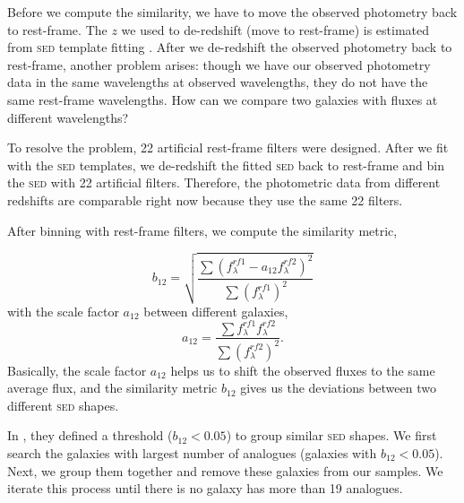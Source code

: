 \documentclass{ar-1col}
\begin{document}
Before we compute the similarity, we have to move the observed photometry back to rest-frame.
The $z$ we used to de-redshift (move to rest-frame) is estimated from \textsc{sed} template fitting \citep{Brammer2008}.
After we de-redshift the observed photometry back to rest-frame, another problem arises: though we have our observed photometry data in the same wavelengths at observed wavelengths, they do not have the same rest-frame wavelengths.
How can we compare two galaxies with fluxes at different wavelengths?

To resolve the problem, 22 artificial rest-frame filters were designed.
After we fit with the \textsc{sed} templates, we de-redshift the fitted \textsc{sed} back to rest-frame and bin the \textsc{sed} with 22 artificial filters.
Therefore, the photometric data from different redshifts are comparable right now because they use the same 22 filters.

After binning with rest-frame filters, we compute the similarity metric,

\begin{equation}
    b_{12} = \sqrt{
            \frac{ 
                \sum{ (f^{rf1}_\lambda - a_{12} f^{rf2}_\lambda )^2 } 
            }{
                \sum{ (f^{rf1}_\lambda)^2 }
            }
    }
    \label{eq:similarity}
\end{equation}
with the scale factor $a_{12}$ between different galaxies,
\begin{equation}
    a_{12} = \frac{\sum{ f^{rf1}_\lambda f^{rf2}_\lambda }}{ \sum{ (f^{rf2}_\lambda )^2 } }.
    \label{eq:scale}
\end{equation}
Basically, the scale factor $a_{12}$ helps us to shift the observed fluxes to the same average flux, and the similarity metric $b_{12}$ gives us the deviations between two different \textsc{sed} shapes.

In \citet{Forrest2018}, they defined a threshold ($ b_{12} < 0.05 $) to group similar \textsc{sed} shapes. 
We first search the galaxies with largest number of analogues (galaxies with $b_{12} < 0.05$).
Next, we group them together and remove these galaxies from our samples.
We iterate this process until there is no galaxy has more than 19 analogues. 
\end{document}
